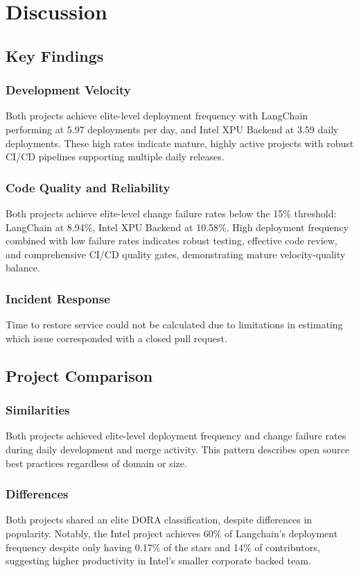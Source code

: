 \documentclass[12pt]{article}
\begin{document}
\section{Discussion}

\subsection{Key Findings}

\subsubsection{Development Velocity}
Both projects achieve elite-level deployment frequency with LangChain
performing at
5.97 deployments per day, and Intel XPU Backend at 3.59 daily
deployments. These high rates
indicate mature, highly active projects with robust CI/CD pipelines
supporting multiple
daily releases.

\subsubsection{Code Quality and Reliability}
Both projects achieve elite-level change failure rates below the 15\%
threshold: LangChain at 8.94\%, Intel XPU Backend at 10.58\%. High
deployment frequency combined with low failure rates indicates robust
testing, effective code review, and comprehensive CI/CD quality
gates, demonstrating mature velocity-quality balance.

\subsubsection{Incident Response}
Time to restore service could not be calculated due to limitations in
estimating which issue corresponded with a closed pull request.

\subsection{Project Comparison}

\subsubsection{Similarities}
Both projects achieved elite-level deployment frequency and change
failure rates during daily development and merge activity. This
pattern describes open
source best practices regardless of domain or size.

\subsubsection{Differences}
Both projects shared an elite DORA classification, despite
differences in popularity.
Notably, the Intel project achieves 60\% of Langchain's deployment frequency
despite only having 0.17\% of the stars and 14\% of contributors,
suggesting higher productivity
in Intel's smaller corporate backed team.
\end{document}
